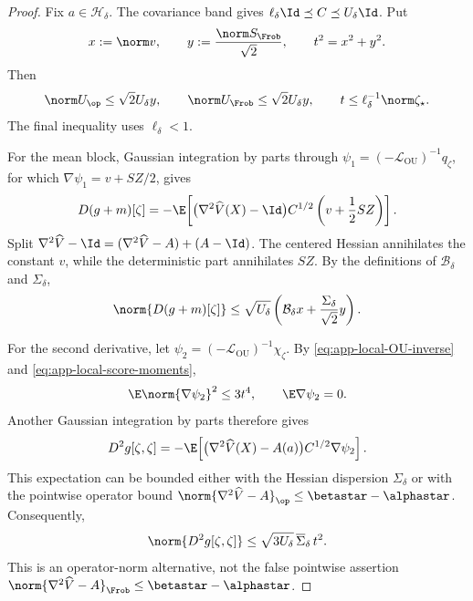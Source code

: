\begin{proof}
Fix \(a\in\mathcal H_\delta\).  The covariance band gives
\(\ell_\delta\Id\preceq C\preceq U_\delta\Id\).  Put
\[
  x:=\norm v,\qquad
  y:=\frac{\norm S_{\Frob}}{\sqrt2},
  \qquad t^2=x^2+y^2.
\]
Then
\begin{equation}
  \norm U_{\op}\leq\sqrt2U_\delta y,\qquad
  \norm U_{\Frob}\leq\sqrt2U_\delta y,\qquad
  t\leq\ell_\delta^{-1}\norm\zeta_\star.
  \label{eq:app-local-band-conversion}
\end{equation}
The final inequality uses \(\ell_\delta<1\).

For the mean block, Gaussian integration by parts through
\(\psi_1=(-\mathcal L_{\mathrm{OU}})^{-1}q_\zeta\), for which
\(\nabla\psi_1=v+SZ/2\), gives
\begin{equation}
  D(g+m)[\zeta]
  =
  -\E\!\left[
    \bigl(\nabla^2\widehat V(X)-\Id\bigr)
    C^{1/2}\left(v+\frac12SZ\right)
  \right].
  \label{eq:app-local-first-g-derivative}
\end{equation}
Split
\(\nabla^2\widehat V-\Id=(\nabla^2\widehat V-A)+(A-\Id)\).
The centered Hessian annihilates the constant \(v\), while the deterministic
part annihilates \(SZ\).  By the definitions of
\(\mathcal B_\delta\) and \(\Sigma_\delta\),
\begin{equation}
  \norm{D(g+m)[\zeta]}
  \leq
  \sqrt{U_\delta}
  \left(\mathcal B_\delta x+\frac{\Sigma_\delta}{\sqrt2}y\right).
  \label{eq:app-local-first-g-bound}
\end{equation}

For the second derivative, let
\(\psi_2=(-\mathcal L_{\mathrm{OU}})^{-1}\chi_\zeta\).  By
\eqref{eq:app-local-OU-inverse} and
\eqref{eq:app-local-score-moments},
\[
  \E\norm{\nabla\psi_2}^2\leq3t^4,\qquad
  \E\nabla\psi_2=0.
\]
Another Gaussian integration by parts therefore gives
\[
  D^2g[\zeta,\zeta]
  =
  -\E\!\left[
    \bigl(\nabla^2\widehat V(X)-A(a)\bigr)
    C^{1/2}\nabla\psi_2
  \right].
\]
This expectation can be bounded either with the Hessian dispersion
\(\Sigma_\delta\) or with the pointwise operator bound
\(\norm{\nabla^2\widehat V-A}_{\op}\leq\betastar-\alphastar\).
Consequently,
\begin{equation}
  \norm{D^2g[\zeta,\zeta]}
  \leq
  \sqrt{3U_\delta}\,\overline\Sigma_\delta\,t^2.
  \label{eq:app-local-second-g-bound}
\end{equation}
This is an operator-norm alternative, not the false pointwise assertion
\(\norm{\nabla^2\widehat V-A}_{\Frob}
\leq\betastar-\alphastar\).


\end{proof}

